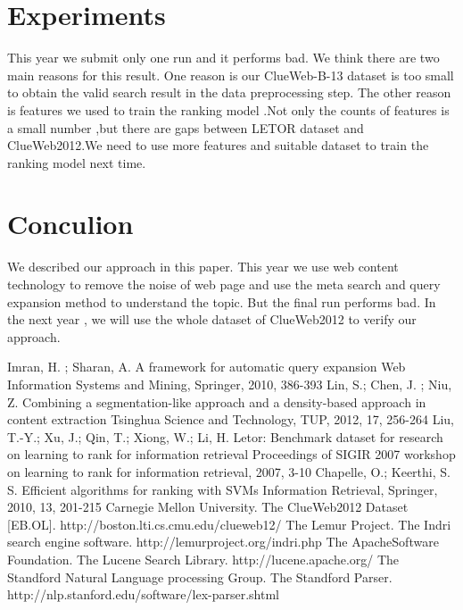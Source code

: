 \documentclass[runningheads,a4paper]{llncs}
\begin{document}
\section{Experiments}

This year we submit only one run and it performs bad. We think there are two main reasons for this result. One reason is our ClueWeb-B-13 dataset is too small to obtain the valid search result in the data preprocessing step. The other reason is features we used to train the ranking model .Not only the counts of features is a small number ,but there are gaps between LETOR dataset and ClueWeb2012.We need to use more features and suitable dataset to train the ranking model next time.

\section{Conculion}

We described our approach in this paper. This year we use web content technology to remove the noise of web page and use the meta search and query expansion method to understand the topic. But the final run performs bad. In the next year , we will use the whole dataset of ClueWeb2012 to verify our approach.


\begin{thebibliography}{4}
Imran, H. ; Sharan, A. A framework for automatic query expansion Web Information Systems and Mining, Springer, 2010, 386-393
Lin, S.; Chen, J. ; Niu, Z. Combining a segmentation-like approach and a density-based approach in content extraction Tsinghua Science and Technology, TUP, 2012, 17, 256-264
Liu, T.-Y.; Xu, J.; Qin, T.; Xiong, W.; Li, H. Letor: Benchmark dataset for research on learning to rank for information retrieval Proceedings of SIGIR 2007 workshop on learning to rank for information retrieval, 2007, 3-10
Chapelle, O.; Keerthi, S. S. Efficient algorithms for ranking with SVMs Information Retrieval, Springer, 2010, 13, 201-215
 Carnegie Mellon University. The ClueWeb2012 Dataset [EB.OL]. http://boston.lti.cs.cmu.edu/clueweb12/
 The Lemur Project. The Indri search engine software. http://lemurproject.org/indri.php
 The ApacheSoftware Foundation. The Lucene Search Library. http://lucene.apache.org/
 The Standford Natural Language processing Group. The Standford Parser. http://nlp.stanford.edu/software/lex-parser.shtml
\end{thebibliography}
\end{document}
